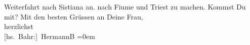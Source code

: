 \begin{ledgroupsized}[t]{13cm}
{{{                  Weiterfahrt nach Sistiana an.}}}\label{K_L01670-1h} nach Fiume und Triest zu machen. Kommst Du mit?\pend
           \pstart
           Mit den besten Grüssen an Deine Frau,{\\[\baselineskip]}herzlichst{\\[\baselineskip]}\spacefill\mbox{{[}hs. Bahr:{]} HermannB}\pend
           \leftskip=0em{}
         
         \endnumbering{}\end{ledgroupsized}  \newcommand{\dateiname}{L01670}\newcommand{\titel}{Hermann Bahr an Arthur Schnitzler, 26. 4. 1907}\newcommand{\editorInnen}{ Kurt Ifkovits,  Martin Anton Müller}
      